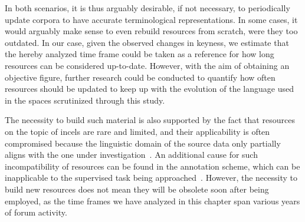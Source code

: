 \documentclass[11pt]{article}
\begin{document}
In both scenarios, it is thus arguably desirable, if not necessary, to periodically update corpora to have accurate terminological representations. In some cases, it would arguably make sense to even rebuild resources from scratch, were they too outdated. In our case, given the observed changes in keyness, we estimate that the hereby analyzed time frame could be taken as a reference for how long resources can be considered up-to-date. However, with the aim of obtaining an objective figure, further research could be conducted to quantify how often resources should be updated to keep up with the evolution of the language used in the spaces scrutinized through this study.

The necessity to build such material is also supported by the fact that resources on the topic of incels are rare and limited, and their applicability is often compromised because the linguistic domain of the source data only partially aligns with the one under investigation~\cite{pelzer-2021-toxic-language-incel-communities}. An additional cause for such incompatibility of resources can be found in the annotation scheme, which can be inapplicable to the supervised task being approached~\cite{zhou-2022-automated-hs-detection}. However, the necessity to build new resources does not mean they will be obsolete soon after being employed, as the time frames we have analyzed in this chapter span various years of forum activity.



\end{document}
